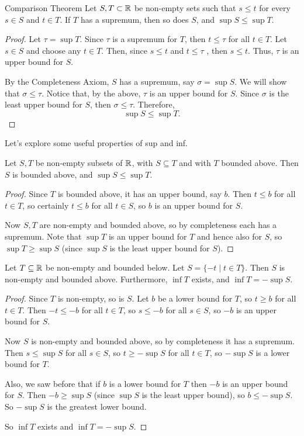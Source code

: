 \begin{thrm}{Comparison Theorem}{}
Let $S, T \subset \mathbb R$ be non-empty sets such that $s \le t$
for every $s \in S$ and $t \in T$. If $T$ has a supremum, then so does $S$, and $\sup S \le \sup T$.
\end{thrm}

\begin{proof}
Let $\tau = \sup T$. Since $\tau$ is a supremum for $T$, then $t \le \tau$ for all $t \in T$. Let $s \in S$ and choose any $t \in T$. Then, since $s \le t$ and $t \le \tau$ , then $s \le t$. Thus, $\tau$ is an upper bound for $S$. 

By the Completeness Axiom, $S$ has a supremum, say $\sigma = \sup S$. We will show that $\sigma \le \tau$. Notice that, by the above, $\tau$ is an upper bound for $S$. Since $\sigma$ is the least upper bound for $S$, then $\sigma \le \tau$. Therefore,
\[\sup S \le \sup T.\]
\end{proof}

Let's explore some useful properties of sup and inf.

\begin{proposition}
Let $S, T$ be non-empty subsets of $\mathbb R$, with $S \subseteq T$ and with $T$ bounded above. Then $S$ is bounded above, and $\sup S \le \sup T$.
\end{proposition}
\begin{proof}
Since $T$ is bounded above, it has an upper bound, say $b$. Then $t \le b$ for all $t \in T$, so certainly $t \le b$ for all $t \in S$, so $b$ is an upper bound for $S$.

Now $S, T$ are non-empty and bounded above, so by completeness each has a supremum. Note that $\sup T$ is an upper bound for $T$ and hence also for $S$, so $\sup T \ge \sup S$ (since $\sup S$ is the least upper bound for $S$).
\end{proof}

\begin{proposition}
Let $T \subseteq \mathbb R$ be non-empty and bounded below. Let $S = \{-t \mid t \in T\}$. Then $S$ is non-empty and bounded above. Furthermore, $\inf T$ exists, and $\inf T = -\sup S$.
\end{proposition}
\begin{proof}
Since $T$ is non-empty, so is $S$. Let $b$ be a lower bound for $T$, so $t \ge b$ for all $t \in T$. Then $-t \le -b$ for all $t \in T$, so $s \le -b$ for all $s \in S$, so $-b$ is an upper
bound for $S$.

Now $S$ is non-empty and bounded above, so by completeness it has a
supremum. Then $s \le \sup S$ for all $s \in S$, so $t \ge -\sup S$ for all $t \in T$, so $-\sup S$ is a lower bound for $T$.

Also, we saw before that if $b$ is a lower bound for $T$ then $-b$ is an upper bound for $S$. Then $-b \ge \sup S$ (since $\sup S$ is the least upper bound), so $b \le -\sup S$. So $-\sup S$ is the greatest lower bound.

So $\inf T$ exists and $\inf T = -\sup S$.
\end{proof}

